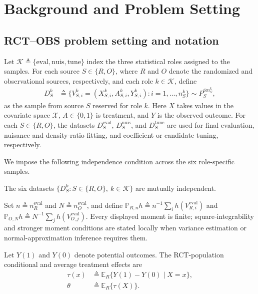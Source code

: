 \section{Background and Problem Setting}
\label{sec:setup}

\subsection{RCT--OBS problem setting and notation}
\label{sec:rct-obs-setting}

Let $\mathcal K\triangleq\{\mathrm{eval},\mathrm{nuis},\mathrm{tune}\}$ index the three statistical roles assigned to the samples. For each source $S\in\{R,O\}$, where $R$ and $O$ denote the randomized and observational sources, respectively, and each role $k\in\mathcal K$, define
\begin{align}
	D_S^k &\triangleq
	\{V_{S,i}^k=(X_{S,i}^k,A_{S,i}^k,Y_{S,i}^k):i=1,\ldots,n_S^k\}
	\sim P_S^{\otimes n_S^k},
	\label{eq:role-indexed-samples}
\end{align}
as the sample from source $S$ reserved for role $k$. Here $X$ takes values in the covariate space $\mathcal X$, $A\in\{0,1\}$ is treatment, and $Y$ is the observed outcome. For each $S\in\{R,O\}$, the datasets $D_S^{\mathrm{eval}}$, $D_S^{\mathrm{nuis}}$, and $D_S^{\mathrm{tune}}$ are used for final evaluation, nuisance and density-ratio fitting, and coefficient or candidate tuning, respectively.

We impose the following independence condition across the six role-specific samples.
\begin{assumption}
\label{ass:honest-separation}
	The six datasets $\{D_S^k:S\in\{R,O\},\ k\in\mathcal K\}$ are mutually independent.
\end{assumption}

Set $n\triangleq n_R^{\mathrm{eval}}$ and $N\triangleq n_O^{\mathrm{eval}}$, and define $\mathbb P_{R,n}h\triangleq n^{-1}\sum_i h(V_{R,i}^{\mathrm{eval}})$ and $\mathbb P_{O,N}h\triangleq N^{-1}\sum_j h(V_{O,j}^{\mathrm{eval}})$. Every displayed moment is finite; square-integrability and stronger moment conditions are stated locally when variance estimation or normal-approximation inference requires them.

Let $Y(1)$ and $Y(0)$ denote potential outcomes. The RCT-population conditional and average treatment effects are
\begin{align}
	\tau(x) &\triangleq\mathbb E_R\{Y(1)-Y(0)\mid X=x\}, \label{eq:cate}
	\\ 
	\theta &\triangleq\mathbb E_R\{\tau(X)\}.
\end{align}

